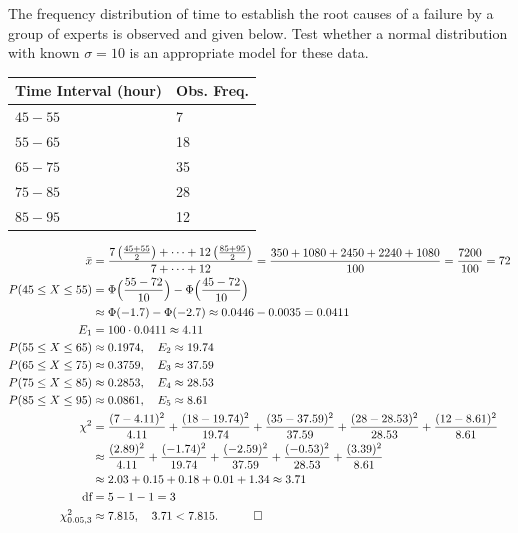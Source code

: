 \begin{hwkProblem}{4}{}

	The frequency distribution of time to establish the root causes of a failure by a group of experts is observed and given below. Test whether a normal distribution with known \( \sigma = 10 \) is an appropriate model for these data.
	\begin{center}
		\begin{tabular}{ll}
			\hline
			Time Interval (hour) & Obs. Freq. \\
			\hline
			\(45-55\) & 7 \\
			\(55-65\) & 18 \\
			\(65-75\) & 35 \\
			\(75-85\) & 28 \\
			\(85-95\) & 12 \\
			\hline
		\end{tabular}
	\end{center}

	\hwkSol

	\begin{align*}
		\bar{x} &= \frac{7\left(\frac{45+55}{2}\right)+\cdots+12\left(\frac{85+95}{2}\right)}{7+\cdots+12} = \frac{350+1080+2450+2240+1080}{100} = \frac{7200}{100} = 72 \\
		P(45 \le X \le 55) &= \Phi\Bigl(\frac{55-72}{10}\Bigr)-\Phi\Bigl(\frac{45-72}{10}\Bigr) \\
				   &\approx \Phi(-1.7)-\Phi(-2.7) \approx 0.0446-0.0035 = 0.0411 \\
		E_1 &= 100 \cdot 0.0411 \approx 4.11 \\
		P(55 \le X \le 65) &\approx 0.1974,\quad E_2 \approx 19.74 \\
		P(65 \le X \le 75) &\approx 0.3759,\quad E_3 \approx 37.59 \\
		P(75 \le X \le 85) &\approx 0.2853,\quad E_4 \approx 28.53 \\
		P(85 \le X \le 95) &\approx 0.0861,\quad E_5 \approx 8.61 \\
		\chi^2 &= \frac{(7-4.11)^2}{4.11}+\frac{(18-19.74)^2}{19.74}+\frac{(35-37.59)^2}{37.59}+\frac{(28-28.53)^2}{28.53}+\frac{(12-8.61)^2}{8.61} \\
		       &\approx \frac{(2.89)^2}{4.11}+\frac{(-1.74)^2}{19.74}+\frac{(-2.59)^2}{37.59}+\frac{(-0.53)^2}{28.53}+\frac{(3.39)^2}{8.61} \\
		       &\approx 2.03+0.15+0.18+0.01+1.34 \approx 3.71 \\
		\text{df} &= 5 - 1 - 1 = 3 \\
		\chi^2_{0.05,3} &\approx 7.815,\quad 3.71 < 7.815. \quad \qed
	\end{align*}

\end{hwkProblem}

